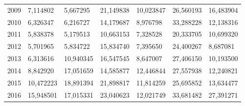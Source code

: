 \begin{table}
\begin{tabular}{p{1cm}p{2cm}p{2cm}p{2cm}p{2cm}p{2cm}p{2cm}}
 2009 &     7,114802 &          5,667295 &                       21,149838 &                                    10,023847 &                                   26,560193 &                      16,483904 \\
 2010 &     6,326347 &          6,216727 &                       14,179687 &                                     8,976798 &                                   33,288228 &                      12,138316 \\
 2011 &     5,838378 &          5,179513 &                       10,663153 &                                     7,328528 &                                   20,333705 &                      10,699320 \\
 2012 &     5,701965 &          5,834722 &                       15,834740 &                                     7,395650 &                                   24,400267 &                       8,687081 \\
 2013 &     6,313616 &         10,940345 &                       16,547545 &                                     8,647007 &                                   27,406150 &                      10,193500 \\
 2014 &     8,842920 &         17,051659 &                       14,585877 &                                    12,446844 &                                   27,557938 &                      12,240821 \\
 2015 &    10,472223 &         18,891394 &                       21,898817 &                                    11,814259 &                                   25,695852 &                      13,634477 \\
 2016 &    15,948501 &         17,015331 &                       23,040623 &                                    12,021749 &                                   33,681482 &                      27,391271 \\
\bottomrule
\end{tabular}
\end{table}

